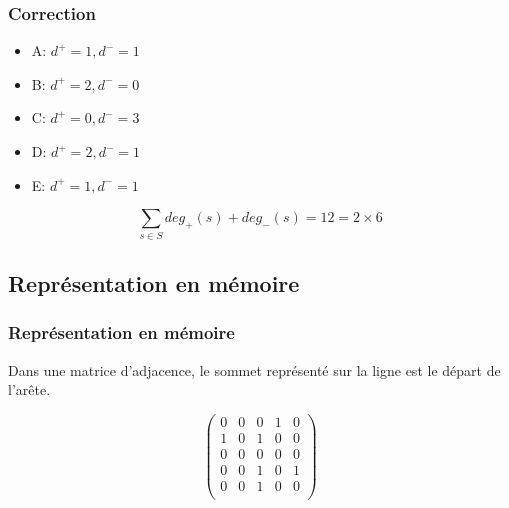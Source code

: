 \documentclass[svgnames,11pt]{beamer}
\begin{document}
\begin{frame}
    \frametitle{Correction}

        \begin{itemize}
            \item A: $d^+=1, d^-=1$
            \item B: $d^+=2, d^-=0$
            \item C: $d^+=0, d^-=3$
            \item D: $d^+=2, d^-=1$
            \item E: $d^+=1, d^-=1$
        \end{itemize}
    \vspace{2em}
    $$\sum_{s\in S}{deg_+(s)+deg_-(s)}=12=2×6$$
\end{frame}
\subsection{Représentation en mémoire}
\begin{frame}
    \frametitle{Représentation en mémoire}

    \begin{aretenir}[]
        Dans une matrice d'adjacence, le sommet représenté sur la ligne est le départ de l'arête.
    \end{aretenir}
    \begin{multicols}{2}
        \begin{center}
        \end{center}

        $$\begin{pmatrix}
                0 & 0 & 0 & 1 & 0 \\
                1 & 0 & 1 & 0 & 0 \\
                0 & 0 & 0 & 0 & 0 \\
                0 & 0 & 1 & 0 & 1 \\
                0 & 0 & 1 & 0 & 0 \\
            \end{pmatrix}$$
    \end{multicols}

\end{frame}
\end{document}
